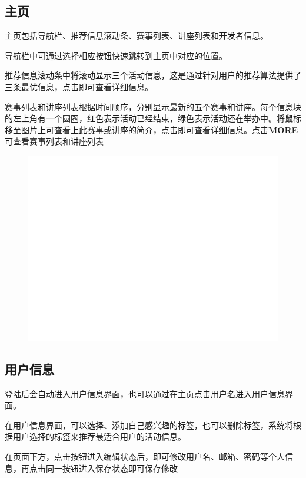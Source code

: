 \documentclass[UTF8]{ctexart}
\begin{document}
\newpage
\subsection{主页}

主页包括导航栏、推荐信息滚动条、赛事列表、讲座列表和开发者信息。

导航栏中可通过选择相应按钮快速跳转到主页中对应的位置。

推荐信息滚动条中将滚动显示三个活动信息，这是通过针对用户的推荐算法提供了三条最优信息，点击即可查看详细信息。

赛事列表和讲座列表根据时间顺序，分别显示最新的五个赛事和讲座。每个信息块的左上角有一个圆圈，红色表示活动已经结束，绿色表示活动还在举办中。将鼠标移至图片上可查看上此赛事或讲座的简介，点击即可查看详细信息。点击{\bfseries MORE}可查看赛事列表和讲座列表
\begin{figure}[h]
    \centering
    \includegraphics[width=\textwidth]{manual_images//temp.png}
\end{figure}

\newpage
\subsection{用户信息}

登陆后会自动进入用户信息界面，也可以通过在主页点击用户名进入用户信息界面。

在用户信息界面，可以选择、添加自己感兴趣的标签，也可以删除标签，系统将根据用户选择的标签来推荐最适合用户的活动信息。

在页面下方，点击按钮进入编辑状态后，即可修改用户名、邮箱、密码等个人信息，再点击同一按钮进入保存状态即可保存修改
\end{document}
